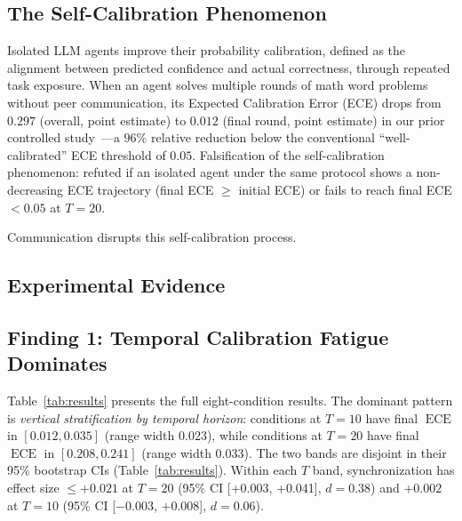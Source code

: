 \documentclass[11pt]{article}
\DeclareMathOperator{\ECE}{ECE}
\begin{document}
\subsection{The Self-Calibration Phenomenon}

Isolated LLM agents improve their probability calibration, defined as the alignment between predicted confidence and actual correctness, through repeated task exposure. When an agent solves multiple rounds of math word problems without peer communication, its Expected Calibration Error (ECE) drops from $0.297$ (overall, point estimate) to $0.012$ (final round, point estimate) in our prior controlled study~\cite{liu2026calibration}---a $96\%$ relative reduction below the conventional ``well-calibrated'' ECE threshold of $0.05$. Falsification of the self-calibration phenomenon: refuted if an isolated agent under the same protocol shows a non-decreasing ECE trajectory (final ECE $\geq$ initial ECE) or fails to reach final ECE $< 0.05$ at $T = 20$.

Communication disrupts this self-calibration process.

\subsection{Experimental Evidence}

\subsection{Finding 1: Temporal Calibration Fatigue Dominates}

Table~\ref{tab:results} presents the full eight-condition results. The dominant pattern is \textit{vertical stratification by temporal horizon}: conditions at $T{=}10$ have final $\ECE$ in $[0.012, 0.035]$ (range width $0.023$), while conditions at $T{=}20$ have final $\ECE$ in $[0.208, 0.241]$ (range width $0.033$). The two bands are disjoint in their 95\% bootstrap CIs (Table~\ref{tab:results}). Within each $T$ band, synchronization has effect size $\leq +0.021$ at $T{=}20$ (95\% CI [+0.003, +0.041], $d = 0.38$) and $+0.002$ at $T{=}10$ (95\% CI [$-0.003$, $+0.008$], $d = 0.06$).
\end{document}

